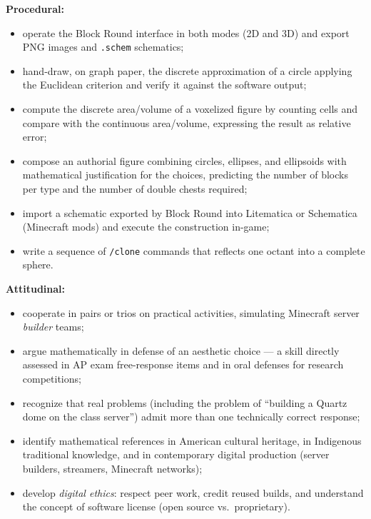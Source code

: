 \documentclass[12pt,a4paper]{scrartcl}
\newcommand{\cmd}[1]{\textcolor{earth}{\texttt{\small #1}}}
\begin{document}
\textbf{Procedural:}
\begin{itemize}[leftmargin=1.3em,itemsep=0.2em,topsep=0.3em]
  \item operate the Block Round interface in both modes (2D and 3D) and export PNG images and \texttt{.schem} schematics;
  \item hand-draw, on graph paper, the discrete approximation of a circle applying the Euclidean criterion and verify it against the software output;
  \item compute the discrete area/volume of a voxelized figure by counting cells and compare with the continuous area/volume, expressing the result as relative error;
  \item compose an authorial figure combining circles, ellipses, and ellipsoids with mathematical justification for the choices, predicting the number of blocks per type and the number of double chests required;
  \item import a schematic exported by Block Round into Litematica or Schematica (Minecraft mods) and execute the construction in-game;
  \item write a sequence of \cmd{/clone} commands that reflects one octant into a complete sphere.
\end{itemize}

\textbf{Attitudinal:}
\begin{itemize}[leftmargin=1.3em,itemsep=0.2em,topsep=0.3em]
  \item cooperate in pairs or trios on practical activities, simulating Minecraft server \emph{builder} teams;
  \item argue mathematically in defense of an aesthetic choice --- a skill directly assessed in AP exam free-response items and in oral defenses for research competitions;
  \item recognize that real problems (including the problem of \enquote{building a Quartz dome on the class server}) admit more than one technically correct response;
  \item identify mathematical references in American cultural heritage, in Indigenous traditional knowledge, and in contemporary digital production (server builders, streamers, Minecraft networks);
  \item develop \emph{digital ethics}: respect peer work, credit reused builds, and understand the concept of software license (open source vs.\ proprietary).
\end{itemize}

\end{document}
